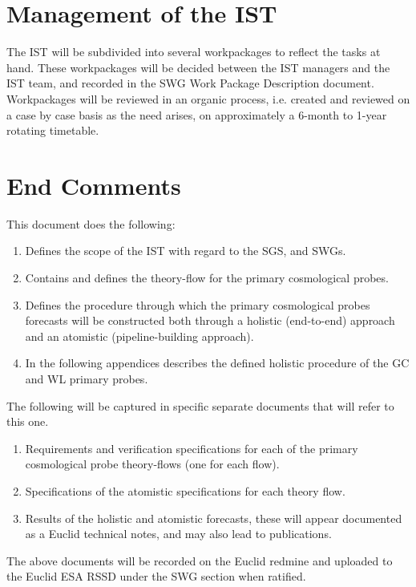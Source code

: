\section{Management of the IST} 
The IST will be subdivided into several workpackages to reflect the tasks at hand. These workpackages will be decided between the 
IST managers and the IST team, and recorded in the SWG Work Package Description document. Workpackages will be reviewed in an 
organic process, i.e. created and reviewed on a case by case basis as the need arises, on approximately a 6-month to 1-year rotating 
timetable.  

\section{End Comments}
This document does the following:
\begin{enumerate} 
\item 
Defines the scope of the IST with regard to the SGS, and SWGs. 
\item 
Contains and defines the theory-flow for the primary cosmological probes. 
\item 
Defines the procedure through which the primary cosmological probes forecasts will be constructed both through a 
holistic (end-to-end) approach and an atomistic (pipeline-building approach). 
\item 
In the following appendices describes the defined holistic procedure of the GC and WL primary probes. 
\end{enumerate}
The following will be captured in specific separate documents that will refer to this one. 
\begin{enumerate} 
\item 
Requirements and verification specifications for each of the primary cosmological probe theory-flows (one for each 
flow). 
\item 
Specifications of the atomistic specifications for each theory flow. 
\item
Results of the holistic and atomistic forecasts, these will appear documented as a Euclid technical notes, 
and may also lead to publications.  
\end{enumerate} 
The above documents will be recorded on the Euclid redmine and uploaded to the Euclid ESA RSSD under the SWG section 
when ratified.

\newpage

